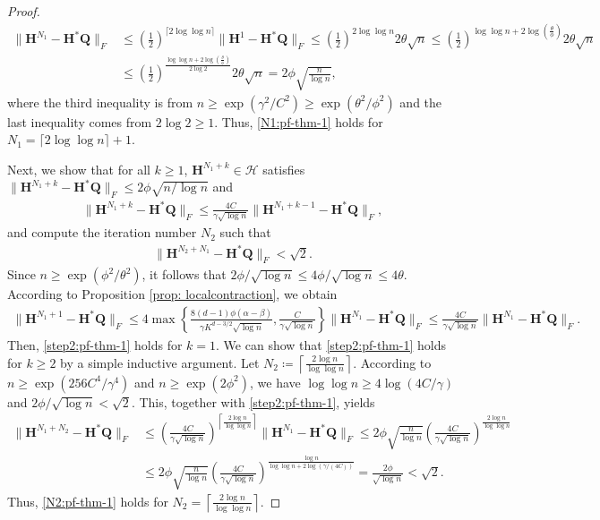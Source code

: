 \documentclass{article}
\theoremstyle{plain}
\theoremstyle{definition}
\theoremstyle{remark}
\newcommand{\BH}{\bm{H}}
\newcommand{\BQ}{\bm{Q}}
\newcommand{\HCal}{\mathcal{H}}
\begin{document}
\begin{appendix}
\begin{center}
\begin{proof}
\begin{align*}
    \|\BH^{N_1} - \BH^* \BQ\|_F &\le \left(\frac{1}{2}\right)^{\lceil 2\log\log n \rceil}\|\BH^1 - \BH^* \BQ\|_F  \le \left(\frac{1}{2}\right)^{ 2\log\log n }2\theta\sqrt{n} \le \left(\frac{1}{2}\right)^{\log\log n + 2\log\left(\frac{\theta}{\phi}\right)}2\theta\sqrt{n} \\
    & \le \left(\frac{1}{2}\right)^{\frac{\log\log n + 2\log\left(\frac{\theta}{\phi}\right)}{2\log 2}}2\theta\sqrt{n} = 2\phi\sqrt{\frac{n}{\log n}},
\end{align*}
where the third inequality is from $n \ge \exp\left(\gamma^2/C^2\right) \ge \exp\left(\theta^2/\phi^2\right)$ and the last inequality comes from $2\log 2 \ge 1$. Thus, \eqref{N1:pf-thm-1} holds for $N_1=\lceil 2\log\log n \rceil + 1$.
   
Next, we show that for all $k \ge 1$, $\BH^{N_1+k} \in \HCal$ satisfies $\|\BH^{N_1+k}-\BH^* \BQ\|_F \le 2\phi\sqrt{n/\log n}$ and
    \begin{align}\label{step2:pf-thm-1}
        \|\BH^{N_1+k} - \BH^*\BQ\|_F \le \frac{4C}{\gamma\sqrt{\log n}} \|\BH^{N_1+k-1}-\BH^*\BQ\|_F,
    \end{align}
    and compute the iteration number $N_2$ such that 
    \begin{align}\label{N2:pf-thm-1}
        \|\BH^{N_2+N_1} - \BH^*\BQ\|_F <  \sqrt{2}. 
    \end{align}
    Since $n\ge \exp\left(\phi^2/\theta^2\right)$, it follows that $2\phi/\sqrt{\log n} \le 4\phi/\sqrt{\log n} \le 4\theta$. According to Proposition \ref{prop: localcontraction}, we obtain
    \begin{align*}
        \|\BH^{N_1+1}-\BH^* \BQ\|_F  \le  4\max\left\{ \frac{8(d-1)\phi (\alpha - \beta)}{\gamma K^{d-3/2}\sqrt{\log n}},\frac{C}{\gamma\sqrt{\log n}} \right\}\|\BH^{N_1}-\BH^* \BQ\|_F
        \le \frac{4C}{\gamma\sqrt{\log n}}\|\BH^{N_1}-\BH^* \BQ\|_F.
    \end{align*}
    Then, \eqref{step2:pf-thm-1} holds for $k=1$. We can show that \eqref{step2:pf-thm-1} holds for $k\ge 2$ by a simple inductive argument. Let $N_2 \coloneqq \left\lceil \frac{2\log n}{\log\log n} \right\rceil$. According to $n \geq \exp(256C^4/\gamma^4)$ and $n \ge \exp\left( 2\phi^2\right)$, we have $\log\log n\ge 4\log(4C/\gamma)$ and $2\phi/\sqrt{\log n} < \sqrt{2}$. This, together with \eqref{step2:pf-thm-1}, yields
    \begin{align*}
        \|\BH^{N_1+N_2} - \BH^* \BQ\|_F  & \le   \left(\frac{4C}{\gamma\sqrt{\log n}} \right)^{\left\lceil \frac{2\log n}{\log\log n} \right\rceil} \|\BH^{N_1}-\BH^* \BQ\|_F  \le 2\phi\sqrt{\frac{n}{\log n}} \left( \frac{4C}{\gamma\sqrt{\log n}} \right)^{\frac{2\log n}{\log\log n}} \\
        & \le 2\phi\sqrt{\frac{n}{\log n}} \left( \frac{4C}{\gamma\sqrt{\log n}} \right)^{\frac{\log n}{\log\log n+2\log(\gamma/(4C))}}  = \frac{2\phi}{\sqrt{\log n}} < \sqrt{2}.
    \end{align*}
    Thus, \eqref{N2:pf-thm-1} holds for $N_2=\left\lceil \frac{2\log n}{\log\log n} \right\rceil$.
    

\end{proof}
\end{center}
\end{appendix}
\end{document}

